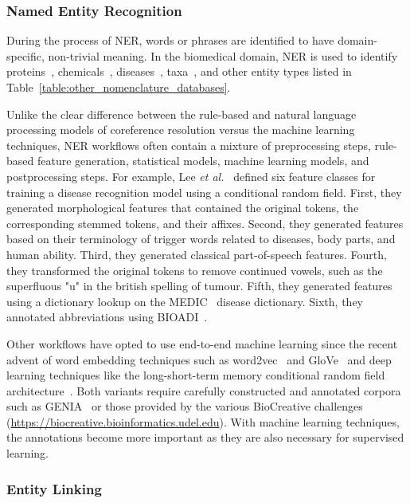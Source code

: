 \subsubsection*{Named Entity Recognition}

During the process of \ac{NER}, words or phrases are identified to have domain-specific, non-trivial meaning.
In the biomedical domain, \ac{NER} is used to identify proteins~\cite{Hsu2008,Leaman2008, Hakenberg2011,Wei2015}, chemicals~\cite{Leaman2015,Corbett2018,Giorgi526244}, diseases~\cite{Leaman2013,Giorgi526244}, taxa~\cite{Gerner2010,Wei2012}, and other entity types listed in Table~\ref{table:other_nomenclature_databases}.

Unlike the clear difference between the rule-based and natural language processing models of coreference resolution versus the machine learning techniques, \ac{NER} workflows often contain a mixture of preprocessing steps, rule-based feature generation, statistical models, machine learning models, and postprocessing steps.
For example, Lee \textit{et al.}~\cite{Lee2015} defined six feature classes for training a disease recognition model using a conditional random field.
First, they generated morphological features that contained the original tokens, the corresponding stemmed tokens, and their affixes.
Second, they generated features based on their terminology of trigger words related to diseases, body parts, and human ability.
Third, they generated classical part-of-speech features.
Fourth, they transformed the original tokens to remove continued vowels, such as the superfluous "u" in the british spelling of tumour.
Fifth, they generated features using a dictionary lookup on the MEDIC~\cite{Davis2012} disease dictionary.
Sixth, they annotated abbreviations using BIOADI~\cite{Kuo2009}.

Other workflows have opted to use end-to-end machine learning since the recent advent of word embedding techniques such as word2vec~\cite{Mikolov2013} and GloVe~\cite{Pennington2014} and deep learning techniques like the long-short-term memory conditional random field architecture~\cite{Lample2016}.
Both variants require carefully constructed and annotated corpora such as GENIA~\cite{Kim2003} or those provided by the various BioCreative challenges (\url{https://biocreative.bioinformatics.udel.edu}).
With machine learning techniques, the annotations become more important as they are also necessary for supervised learning.

\subsubsection*{Entity Linking}

